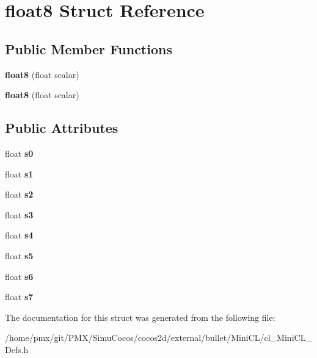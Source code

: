 \hypertarget{structfloat8}{}\section{float8 Struct Reference}
\label{structfloat8}
\subsection*{Public Member Functions}
\begin{DoxyCompactItemize}
\item 
\mbox{\label{structfloat8_a75d30699db80fa3be5ef05a4330a8d45}} 
{\bfseries float8} (float scalar)
\item 
\mbox{\label{structfloat8_a75d30699db80fa3be5ef05a4330a8d45}} 
{\bfseries float8} (float scalar)
\end{DoxyCompactItemize}
\subsection*{Public Attributes}
\begin{DoxyCompactItemize}
\item 
\mbox{\label{structfloat8_ad629e5af1f2d32ce19bfb87d4cd68143}} 
float {\bfseries s0}
\item 
\mbox{\label{structfloat8_a729fc0ae2c7dab9f38c22a390ffbe997}} 
float {\bfseries s1}
\item 
\mbox{\label{structfloat8_a8edd603071c6b8ef930e23c595426ebd}} 
float {\bfseries s2}
\item 
\mbox{\label{structfloat8_a7d8e4c8446ec1990e342af610f8d8040}} 
float {\bfseries s3}
\item 
\mbox{\label{structfloat8_a683cac3364c387458a8c9378192b61af}} 
float {\bfseries s4}
\item 
\mbox{\label{structfloat8_a05742d48d516b351f050bd419e131691}} 
float {\bfseries s5}
\item 
\mbox{\label{structfloat8_ac46b15ec27167156ab270bb6fa9787a1}} 
float {\bfseries s6}
\item 
\mbox{\label{structfloat8_a2c36be91ebc07b9f5a5b8bedd66b2b9e}} 
float {\bfseries s7}
\end{DoxyCompactItemize}


The documentation for this struct was generated from the following file\+:\begin{DoxyCompactItemize}
\item 
/home/pmx/git/\+P\+M\+X/\+Simu\+Cocos/cocos2d/external/bullet/\+Mini\+C\+L/cl\+\_\+\+Mini\+C\+L\+\_\+\+Defs.\+h\end{DoxyCompactItemize}
